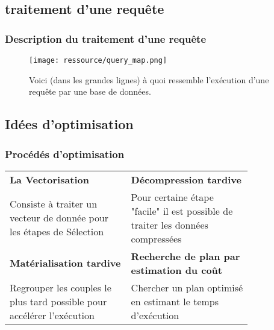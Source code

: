 \documentclass[a4paper,12pt]{beamer}
\begin{document}
\subsection{traitement d'une requête}
\begin{frame}
	\frametitle{Description du traitement d'une requête}
	\begin{figure}[h]
		\centering
		\texttt{[image: ressource/query\_map.png]}
		\caption{Voici (dans les grandes lignes) à quoi ressemble l'exécution d'une requête par une base de données.}
	\end{figure}
\end{frame}
\subsection{Idées d'optimisation }
\begin{frame}
	\frametitle{Procédés d'optimisation}


	\setlength{\tabcolsep}{8pt} %
	\renewcommand{\arraystretch}{2} %

	\begin{center}
		\begin{tabular}{|p{0.4\linewidth}|p{0.4\linewidth}|}
			\hline
			\textbf{La Vectorisation}                                              & \textbf{Décompression tardive}                    \\
			Consiste à traiter un vecteur de donnée pour les étapes de Sélection   &
			Pour certaine étape "facile" il est possible de traiter les données compressées                                            \\
			\hline
			\textbf{Matérialisation tardive}                                       & \textbf{Recherche de plan par estimation du coût} \\
			Regrouper les couples le plus tard possible pour accélérer l'exécution &
			Chercher un plan optimisé en estimant le temps d'exécution                                                                 \\
			\hline
		\end{tabular}
	\end{center}

\end{frame}
\end{document}
